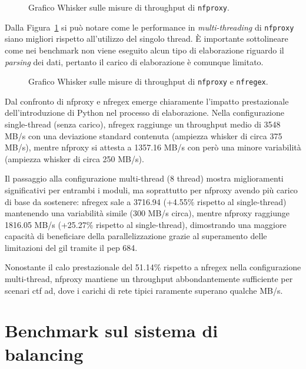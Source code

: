 \begin{figure}[H]
    \centering
    
    \caption{Grafico Whisker sulle misure di throughput di \texttt{nfproxy}.}\label{fig:wisker_nfproxy}
\end{figure}

Dalla Figura~\ref{fig:wisker_nfproxy} si può notare come le performance in \textit{multi-threading} di \texttt{\gls{nfproxy}} siano migliori rispetto all'utilizzo del singolo thread. È importante sottolineare come nei benchmark non viene eseguito alcun tipo di elaborazione riguardo il \textit{parsing} dei dati, pertanto il carico di elaborazione è comunque limitato.

\begin{figure}[H]
    \centering
    
    \caption{Grafico Whisker sulle misure di throughput di \texttt{nfproxy} e \texttt{nfregex}.}\label{fig:wisker_nfproxy_nfregex}
\end{figure}

Dal confronto di \gls{nfproxy} e \gls{nfregex} emerge chiaramente l'impatto prestazionale dell'introduzione di Python nel processo di elaborazione. Nella configurazione single-thread (senza carico), \gls{nfregex} raggiunge un throughput medio di 3548 MB/s con una deviazione standard contenuta (ampiezza whisker di circa 375 MB/s), mentre \gls{nfproxy} si attesta a 1357.16 MB/s con però una minore variabilità (ampiezza whisker di circa 250 MB/s). 

Il passaggio alla configurazione multi-thread (8 thread) mostra miglioramenti significativi per entrambi i moduli, ma soprattutto per \gls{nfproxy} avendo più carico di base da sostenere: \gls{nfregex} sale a 3716.94 (+4.55\% rispetto al single-thread) mantenendo una variabilità simile (300 MB/s circa), mentre \gls{nfproxy} raggiunge 1816.05 MB/s (+25.27\% rispetto al single-thread), dimostrando una maggiore capacità di beneficiare della parallelizzazione grazie al superamento delle limitazioni del \gls{gil} tramite il \gls{pep} 684.

Nonostante il calo prestazionale del 51.14\% rispetto a \gls{nfregex} nella configurazione multi-thread, \gls{nfproxy} mantiene un throughput abbondantemente sufficiente per scenari \gls{ctf} \gls{ad}, dove i carichi di rete tipici raramente superano qualche MB/s.

\section{Benchmark sul sistema di balancing}\label{balancing_benchmark}

